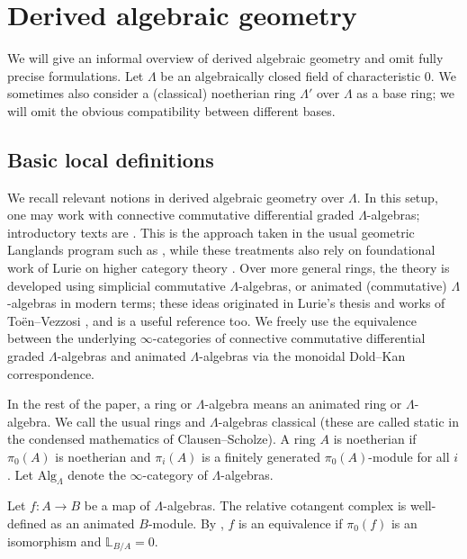 \documentclass{amsart}
\theoremstyle{definition}
\theoremstyle{remark}
\numberwithin{equation}{section}
\newcommand{\bb}{\mathbb}
\newcommand{\Alg}{\mathrm{Alg}}
\begin{document}
\section{Derived algebraic geometry}{\label{s: DAG}}
We will give an informal overview of derived algebraic geometry and omit fully precise formulations. Let $\Lambda$ be an algebraically closed field of characteristic $0$. We sometimes also consider a (classical) noetherian ring $\Lambda'$ over $\Lambda$ as a base ring; we will omit the obvious compatibility between different bases. 

\subsection{Basic local definitions}{\label{ss: DAGbasiclocaldefns}}
We recall relevant notions in derived algebraic geometry over $\Lambda$. In this setup, one may work with connective commutative differential graded $\Lambda$-algebras; introductory texts are \cite{EugsterPridham, ToenDAG}. This is the approach taken in the usual geometric Langlands program such as \cite{GaitsgoryIndCohSheaves, GRInd, GRI}, while these treatments also rely on foundational work of Lurie on higher category theory \cite{LurieHTT, LurieHA}. Over more general rings, the theory is developed using simplicial commutative $\Lambda$-algebras, or animated (commutative) $\Lambda$-algebras \cite{CesnaviciusScholze} in modern terms; these ideas originated in Lurie's thesis \cite{LurieThesis} and works of To\"en--Vezzosi \cite{TVI, TVII}, and \cite{HansenMann} is a useful reference too. We freely use the equivalence between the underlying $\infty$-categories of connective commutative differential graded $\Lambda$-algebras and animated $\Lambda$-algebras via the monoidal Dold--Kan correspondence. 

In the rest of the paper, a ring or $\Lambda$-algebra means an animated ring or $\Lambda$-algebra. We call the usual rings and $\Lambda$-algebras classical (these are called static in the condensed mathematics of Clausen--Scholze). A ring $A$ is noetherian if $\pi_0(A)$ is noetherian and $\pi_i(A)$ is a finitely generated $\pi_0(A)$-module for all $i$. Let $\Alg_{\Lambda}$ denote the $\infty$-category of $\Lambda$-algebras. 

Let $f\colon A\to B$ be a map of $\Lambda$-algebras. The relative cotangent complex is well-defined as an animated $B$-module. By \cite[Corollary 3.2.17]{LurieThesis}, $f$ is an equivalence if $\pi_0(f)$ is an isomorphism and $\bb L_{B/A}=0$. 
\end{document}

